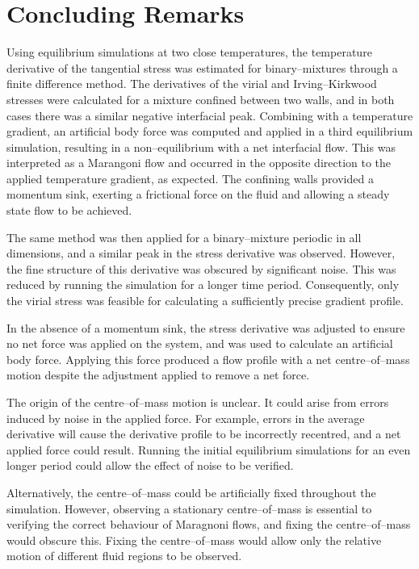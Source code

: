 \section{Concluding Remarks}
Using equilibrium simulations at two close temperatures, the temperature derivative of the tangential stress was estimated for binary--mixtures through a finite difference method.
The derivatives of the virial and Irving--Kirkwood stresses were calculated for a mixture confined between two walls, and in both cases there was a similar negative interfacial peak.
Combining with a temperature gradient, an artificial body force was computed and applied in a third equilibrium simulation, resulting in a non--equilibrium with a net interfacial flow.
This was interpreted as a Marangoni flow and occurred in the opposite direction to the applied temperature gradient, as expected.
The confining walls provided a momentum sink, exerting a frictional force on the fluid and allowing a steady state flow to be achieved.

The same method was then applied for a binary--mixture periodic in all dimensions, and a similar peak in the stress derivative was observed.
However, the fine structure of this derivative was obscured by significant noise.
This was reduced by running the simulation for a longer time period.
Consequently, only the virial stress was feasible for calculating a sufficiently precise gradient profile.

In the absence of a momentum sink, the stress derivative was adjusted to ensure no net force was applied on the system, and was used to calculate an artificial body force.
Applying this force produced a flow profile with a net centre--of--mass motion despite the adjustment applied to remove a net force.

The origin of the centre--of--mass motion is unclear. 
It could arise from errors induced by noise in the applied force.
For example, errors in the average derivative will cause the derivative profile to be incorrectly recentred, and a net applied force could result.
Running the initial equilibrium simulations for an even longer period could allow the effect of noise to be verified. 

Alternatively, the centre--of--mass could be artificially fixed throughout the simulation.
However, observing a stationary centre--of--mass is essential to verifying the correct behaviour of Maragnoni flows, and fixing the centre--of--mass would obscure this.
Fixing the centre--of--mass would allow only the relative motion of different fluid regions to be observed.

